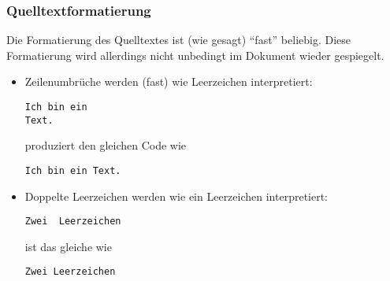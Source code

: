\begin{frame}[fragile]
  \frametitle{Quelltextformatierung}

  \onslide<+->

  Die Formatierung des Quelltextes ist (wie gesagt) \enquote{fast} beliebig.  Diese
  Formatierung wird allerdings nicht unbedingt im Dokument wieder gespiegelt.

  \begin{itemize}
  \item<+-> Zeilenumbrüche werden (fast) wie Leerzeichen interpretiert:
\begin{lstlisting}
Ich bin ein
Text.
\end{lstlisting}
    produziert den gleichen Code wie
\begin{lstlisting}
Ich bin ein Text.
\end{lstlisting}
  \item<+-> Doppelte Leerzeichen werden wie ein Leerzeichen interpretiert:
\begin{lstlisting}[showspaces=true]
Zwei  Leerzeichen
\end{lstlisting}
ist das gleiche wie
\begin{lstlisting}[showspaces=true]
Zwei Leerzeichen
\end{lstlisting}
  \end{itemize}

\end{frame}

